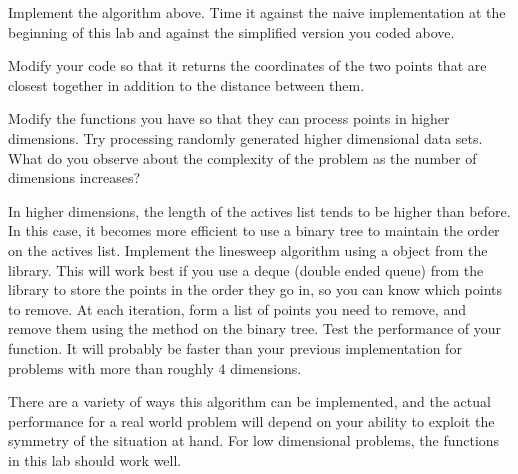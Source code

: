 \begin{problem}
Implement the algorithm above. 
Time it against the naive implementation at the beginning of this lab and against the simplified version you coded above.
\end{problem}

\begin{problem}
Modify your code so that it returns the coordinates of the two points that are closest together in addition to the distance between them.
\end{problem}

\begin{problem}
Modify the functions you have so that they can process points in higher dimensions. 
Try processing randomly generated higher dimensional data sets. 
What do you observe about the complexity of the problem as the number of dimensions increases?
\end{problem}

\begin{problem}
In higher dimensions, the length of the actives list tends to be higher than before. In this case, it becomes more efficient to use a binary tree to maintain the order on the actives list. 
Implement the linesweep algorithm using a  object from the  library. 
This will work best if you use a deque (double ended queue) from the  library to store the points in the order they go in, so you can know which points to remove. 
At each iteration, form a list of points you need to remove, and remove them using the  method on the binary tree. 
Test the performance of your function. 
It will probably be faster than your previous implementation for problems with more than roughly $4$ dimensions. 
\end{problem}

There are a variety of ways this algorithm can be implemented, and the actual performance for a real world problem will depend on your ability to exploit the symmetry of the situation at hand. 
For low dimensional problems, the functions in this lab should work well.
